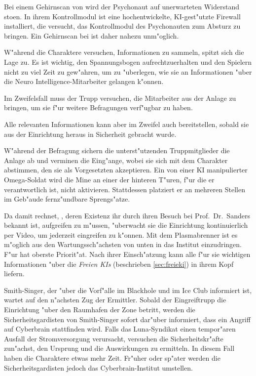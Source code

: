 Bei einem Gehirnscan von \ml{} wird der Psychonaut auf unerwarteten Widerstand sto\3en. In ihrem Kontrollmodul ist eine hochentwickelte, KI-gest"utzte Firewall installiert, die versucht, das Kontrollmodul des Psychonauten zum Absturz zu bringen. Ein Gehirnscan bei \ml{} ist daher nahezu unm"oglich.

\begin{remarks}
	W"ahrend die Charaktere versuchen, Informationen zu sammeln, spitzt sich die Lage zu. Es ist wichtig, den Spannungsbogen aufrechtzuerhalten und den Spielern nicht zu viel Zeit zu gew"ahren, um zu "uberlegen, wie sie an Informationen "uber die Neuro Intelligence-Mitarbeiter gelangen k"onnen. 
	
	Im Zweifelsfall muss der Trupp versuchen, die Mitarbeiter aus der Anlage zu bringen, um sie f"ur weitere Befragungen verf"ugbar zu haben. 
	
	Alle relevanten Informationen kann aber im Zweifel auch \ml{} bereitstellen, sobald sie aus der Einrichtung heraus in Sicherheit gebracht wurde.
\end{remarks}

W"ahrend der Befragung sichern die unterst"utzenden Truppmitglieder die Anlage ab und verminen die Eing"ange, wobei sie sich mit dem Charakter abstimmen, den sie als Vorgesetzten akzeptieren. Ein von einer KI manipulierter Omega-Soldat wird die Mine an einer der hinteren T"uren, f"ur die er verantwortlich ist, nicht aktivieren. Stattdessen platziert er an mehreren Stellen im Geb"aude fernz"undbare Sprengs"atze.

Da \xl{} damit rechnet, \ml{}, deren Existenz ihr durch ihren Besuch bei Prof.~Dr.~Sanders bekannt ist, aufgreifen zu m"ussen, "uberwacht sie die Einrichtung kontinuierlich per Video, um jederzeit eingreifen zu k"onnen. Mit dem Plasmabrenner ist es m"oglich aus den Wartungssch"achsten von unten in das Institut einzudringen. F"ur \xl{} hat \ml{} oberste Priorit"at. Nach ihrer Einsch"atzung kann \ml{} alle f"ur sie wichtigen Informationen "uber die \emph{Freien KIs} (beschrieben \cref{sec:freieki}) in ihrem Kopf liefern.

Smith-Singer, der "uber die Vorf"alle im Blackhole und im Ice Club informiert ist, wartet auf den n"achsten Zug der Ermittler. Sobald der Eingreiftrupp die Einrichtung "uber den Raumhafen der Zone betritt, werden die Sicherheitsgardisten von Smith-Singer sofort dar"uber informiert, dass ein Angriff auf Cyberbrain stattfinden wird. Falls das Luna-Syndikat einen tempor"aren Ausfall der Stromversorgung verursacht, versuchen die Sicherheitskr"afte zun"achst, den Ursprung und die Auswirkungen zu ermitteln. In diesem Fall haben die Charaktere etwas mehr Zeit. Fr"uher oder sp"ater werden die Sicherheitsgardisten jedoch das Cyberbrain-Institut umstellen. 


